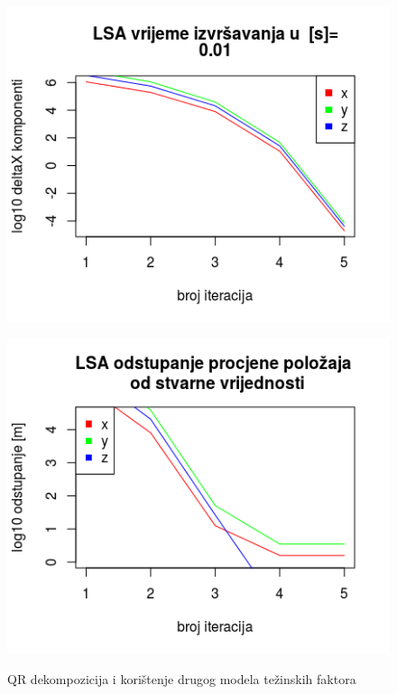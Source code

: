 \documentclass[a4paper,twoside,12pt]{memoir} %
\begin{document}
\begin{figure}[H]
	\begin{minipage}{0.45\textwidth}
		\centering
		\includegraphics[width=1\textwidth]{3LSAdelta2l10QRb}
		\label{fig:3LSAdelta2l10QR}
	\end{minipage}%
	\hspace{1cm}
	\begin{minipage}{0.45\textwidth}
		
		\includegraphics[width=1\textwidth]{3LSAreal2l10QRb}
		\label{fig:3LSAreal2l10QR}
	\end{minipage}%
	\caption{QR dekompozicija i korištenje drugog modela težinskih faktora}
	\label{fig:3LSA2l10QR}
\end{figure}
\end{document}
